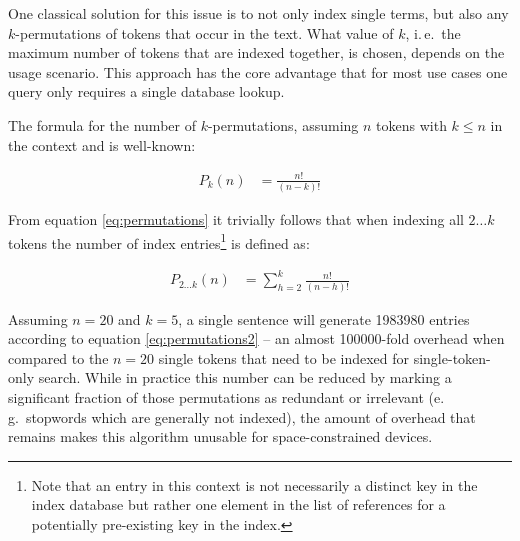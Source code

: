 \documentclass[a4paper, 12pt, twoside, reqn]{report}
\numberwithin{figure}{chapter}
\newtheorem[L]{boxedDefinition}{Definition}
\newtheorem[L]{boxedExample}{Example}
\newcommand{\ie}{i.\,e.\ }
\newcommand{\eg}{e.\,g.\ }
\begin{document}
One classical solution for this issue is to not only index single terms, but also any $k$-permutations of tokens that occur in the text. What value of $k$, \ie the maximum number of tokens that are indexed together, is chosen, depends on the usage scenario. This approach has the core advantage that for most use cases one query only requires a single database lookup.

The formula for the number of $k$-permutations, assuming $n$ tokens with $k \leq n$ in the context and is well-known:

\begin{align}\label{eq:permutations}
 P_k(n) &= \frac{n!}{(n-k)!}
\end{align}

From equation \eqref{eq:permutations} it trivially follows that when indexing all $2{\dots}k$ tokens the number of index entries\footnote{Note that an entry in this context is not necessarily a distinct key in the index database but rather one element in the list of references for a potentially pre-existing key in the index.} is defined as:

\begin{align}\label{eq:permutations2}
 P_{2{\dots}k}(n) &= \sum_{h = 2}^{k}\frac{n!}{(n-h)!}
\end{align}

Assuming $n = 20$ and $k = 5$, a single sentence will generate \num{1983980} entries according to equation \eqref{eq:permutations2} -- an almost \num{100000}-fold overhead when compared to the $n = 20$ single tokens that need to be indexed for single-token-only search. While in practice this number can be reduced by marking a significant fraction of those permutations as redundant or irrelevant (\eg stopwords which are generally not indexed), the amount of overhead that remains makes this algorithm unusable for space-constrained devices. 
\end{document}
